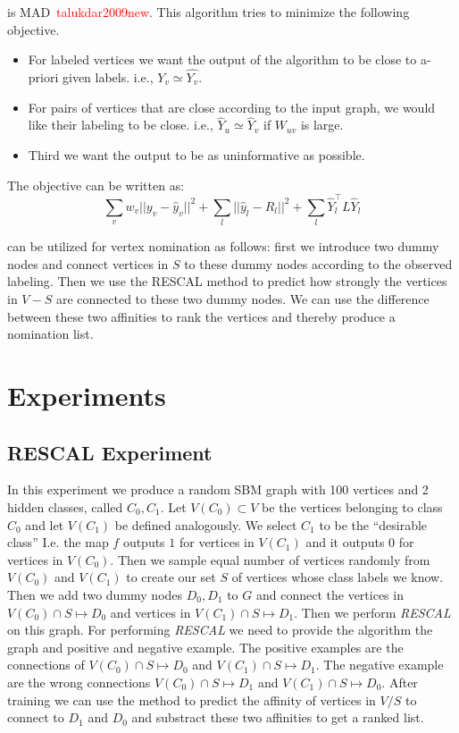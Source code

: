 \documentclass{tufte-handout}
\newcommand{\ie}{i.e.,\xspace}
\renewcommand{\cite}[1]{\textcolor{red}{#1}}
\begin{document}
 is MAD~\cite{talukdar2009new}.
This algorithm tries to minimize the following objective.
\begin{itemize}
\item For labeled vertices we want the output of the algorithm to be close to a-priori given labels. \ie{} $Y_v \simeq \hat{Y_v}$.
\item For pairs of vertices that are close according to the input graph, we would like their labeling to be close. \ie{} $\hat{Y}_u \simeq \hat{Y}_v$ if $W_{uv}$ is large.
\item Third we want the output to be as uninformative as possible.
\end{itemize}
The objective can be written as:
$$ \sum_{v} w_v || y_v - \hat{y}_v ||^2 + \sum_l ||\hat{y}_l - R_l ||^2 + \sum_l \hat{Y}_l^\intercal L \hat{Y}_l $$

 can be utilized for vertex nomination
as follows: first we introduce two dummy nodes and connect vertices in $S$
to these dummy nodes according to the observed labeling. Then we use the RESCAL
method to predict how strongly the vertices in $V-S$ are connected to these two
dummy nodes. We can use the difference between these two affinities to rank the
vertices and thereby produce a nomination list.


\section{Experiments}
\label{sec:experiments}
\subsection{RESCAL Experiment}
\label{sec:simple-experiment}
In this experiment we produce a random SBM graph with 100 vertices and
2 hidden classes, called $C_0, C_1$. Let $V(C_0) \subset V$
be the vertices belonging to class $C_0$ and let $V(C_1)$ be defined
analogously. We select $C_1$ to be the ``desirable class''
I.e. the map $f$ outputs $1$ for vertices in $V(C_1)$
and it outputs $0$ for vertices in $V(C_0)$.
Then we sample equal number of vertices randomly from $V(C_0)$ and $V(C_1)$
to create our set $S$ of vertices whose class labels we know.
Then we add two dummy nodes $D_0, D_1$ to $G$ and connect
the vertices in $V(C_0) \cap S \mapsto D_0$ and
vertices in $V(C_1) \cap S \mapsto D_1$.
Then we perform \textit{RESCAL} on this graph.
For performing \textit{RESCAL} we need to provide the algorithm
the graph and positive and negative example.
The positive examples are the connections of $V(C_0) \cap S \mapsto D_0$
and $V(C_1) \cap S \mapsto D_1$. The negative example are the
wrong connections $V(C_0) \cap S \mapsto D_1$ and $V(C_1) \cap S \mapsto D_0$.
After training we can use the method to predict the affinity of vertices
in $V/S$ to connect to $D_1$ and $D_0$ and substract these two affinities
to get a ranked list.
\end{document}

